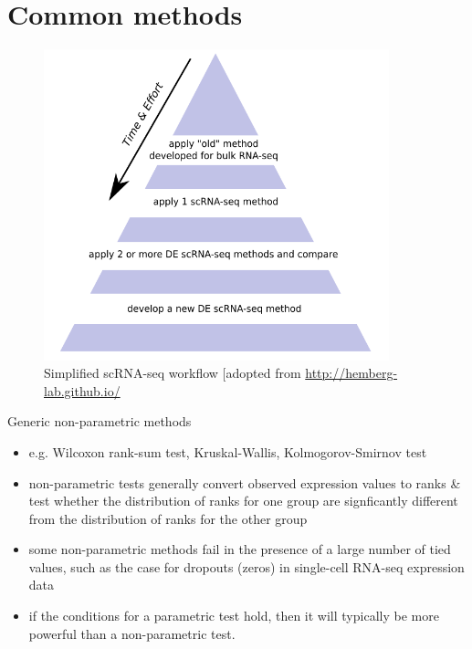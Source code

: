 \documentclass{beamer}\usepackage[]{graphicx}\usepackage[]{color}
\begin{document}
\section{Common methods}
\begin{frame}
\begin{center}
\insertsection
\end{center}
\end{frame}

\begin{frame}
\begin{center}
\begin{figure}
\includegraphics[width=10cm]{Images/solutionTriangle.png}
\caption{Simplified scRNA-seq workflow [adopted from \href{http://hemberg-lab.github.io/]}{http://hemberg-lab.github.io/}}
\end{figure}
\end{center}
\end{frame}

\begin{frame} %
\begin{block}{Generic non-parametric methods}
\begin{itemize}
\small
  \item e.g. Wilcoxon rank-sum test, Kruskal-Wallis, Kolmogorov-Smirnov test
  \item non-parametric tests generally convert observed expression values to ranks \& test whether the distribution of ranks for one group are signficantly different from the distribution of ranks for the other group
  \item some non-parametric methods fail in the presence of a large number of tied values, such as the case for dropouts (zeros) in single-cell RNA-seq expression data
  \item if the conditions for a parametric test hold, then it will typically be more powerful than a non-parametric test.
\end{itemize}
\end{block}
\end{frame}
\end{document}
